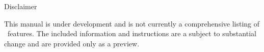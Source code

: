 \newpage

{\Huge 
\vspace*{0.5cm}
\noindent
Disclaimer
} \newline
\vspace*{0.25cm}

\noindent
{\large
This manual is under development and is not currently a comprehensive listing of
\BornAgain\ features. 
The included information and instructions are a subject to substantial change and
are provided only as a preview.
}
